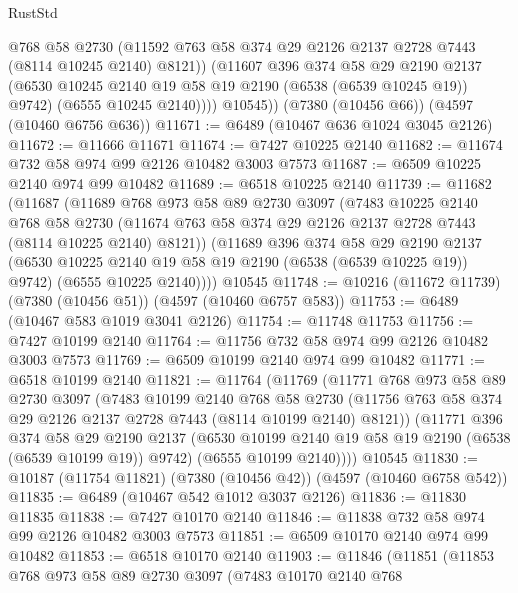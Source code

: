 \begin{lexlean}{RustStd}
\begin{coremodule}
              @768
              @58
              @2730
              (@11592 @763 @58 @374 @29 @2126 @2137 @2728 @7443 (@8114 @10245 @2140) @8121))
            (@11607
              @396
              @374
              @58
              @29
              @2190
              @2137
              (@6530 @10245 @2140 @19 @58 @19 @2190 (@6538 (@6539 @10245 @19)) @9742)
              (@6555 @10245 @2140))))
        @10545))
    (@7380 (@10456 @66))
    (@4597 (@10460 @6756 @636))
@11671 := @6489 (@10467 @636 @1024 @3045 @2126)
@11672 := @11666 @11671
@11674 := @7427 @10225 @2140
@11682 := @11674 @732 @58 @974 @99 @2126 @10482 @3003 @7573
@11687 := @6509 @10225 @2140 @974 @99 @10482
@11689 := @6518 @10225 @2140
@11739 := @11682
    (@11687
      (@11689
        @768
        @973
        @58
        @89
        @2730
        @3097
        (@7483
          @10225
          @2140
          @768
          @58
          @2730
          (@11674 @763 @58 @374 @29 @2126 @2137 @2728 @7443 (@8114 @10225 @2140) @8121))
        (@11689
          @396
          @374
          @58
          @29
          @2190
          @2137
          (@6530 @10225 @2140 @19 @58 @19 @2190 (@6538 (@6539 @10225 @19)) @9742)
          (@6555 @10225 @2140))))
    @10545
@11748 := @10216 (@11672 @11739) (@7380 (@10456 @51)) (@4597 (@10460 @6757 @583))
@11753 := @6489 (@10467 @583 @1019 @3041 @2126)
@11754 := @11748 @11753
@11756 := @7427 @10199 @2140
@11764 := @11756 @732 @58 @974 @99 @2126 @10482 @3003 @7573
@11769 := @6509 @10199 @2140 @974 @99 @10482
@11771 := @6518 @10199 @2140
@11821 := @11764
    (@11769
      (@11771
        @768
        @973
        @58
        @89
        @2730
        @3097
        (@7483
          @10199
          @2140
          @768
          @58
          @2730
          (@11756 @763 @58 @374 @29 @2126 @2137 @2728 @7443 (@8114 @10199 @2140) @8121))
        (@11771
          @396
          @374
          @58
          @29
          @2190
          @2137
          (@6530 @10199 @2140 @19 @58 @19 @2190 (@6538 (@6539 @10199 @19)) @9742)
          (@6555 @10199 @2140))))
    @10545
@11830 := @10187 (@11754 @11821) (@7380 (@10456 @42)) (@4597 (@10460 @6758 @542))
@11835 := @6489 (@10467 @542 @1012 @3037 @2126)
@11836 := @11830 @11835
@11838 := @7427 @10170 @2140
@11846 := @11838 @732 @58 @974 @99 @2126 @10482 @3003 @7573
@11851 := @6509 @10170 @2140 @974 @99 @10482
@11853 := @6518 @10170 @2140
@11903 := @11846
    (@11851
      (@11853
        @768
        @973
        @58
        @89
        @2730
        @3097
        (@7483
          @10170
          @2140
          @768

\end{coremodule}
\end{lexlean}
